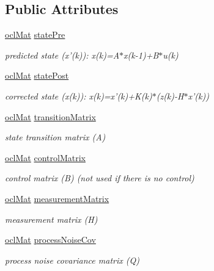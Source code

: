 \subsection*{Public Attributes}
\begin{DoxyCompactItemize}
\item 
\hyperlink{classcv_1_1ocl_1_1oclMat}{ocl\-Mat} \hyperlink{classcv_1_1ocl_1_1KalmanFilter_ac9e06e20a8d043a4564b835d422977b9}{state\-Pre}
\begin{DoxyCompactList}\small\item\em predicted state (x'(k))\-: x(k)=A$\ast$x(k-\/1)+\-B$\ast$u(k) \end{DoxyCompactList}\item 
\hyperlink{classcv_1_1ocl_1_1oclMat}{ocl\-Mat} \hyperlink{classcv_1_1ocl_1_1KalmanFilter_a7988dd038dc54b0a8506a4da0ddcf39b}{state\-Post}
\begin{DoxyCompactList}\small\item\em corrected state (x(k))\-: x(k)=x'(k)+\-K(k)$\ast$(z(k)-\/\-H$\ast$x'(k)) \end{DoxyCompactList}\item 
\hyperlink{classcv_1_1ocl_1_1oclMat}{ocl\-Mat} \hyperlink{classcv_1_1ocl_1_1KalmanFilter_ac31e8bbbeeabf0132ad39d39996f1b0f}{transition\-Matrix}
\begin{DoxyCompactList}\small\item\em state transition matrix (A) \end{DoxyCompactList}\item 
\hyperlink{classcv_1_1ocl_1_1oclMat}{ocl\-Mat} \hyperlink{classcv_1_1ocl_1_1KalmanFilter_a99831c353c2aacc9d9ff3c9ae58f669a}{control\-Matrix}
\begin{DoxyCompactList}\small\item\em control matrix (B) (not used if there is no control) \end{DoxyCompactList}\item 
\hyperlink{classcv_1_1ocl_1_1oclMat}{ocl\-Mat} \hyperlink{classcv_1_1ocl_1_1KalmanFilter_ad3c86cdbe65d9efaf008f23eba39441c}{measurement\-Matrix}
\begin{DoxyCompactList}\small\item\em measurement matrix (H) \end{DoxyCompactList}\item 
\hyperlink{classcv_1_1ocl_1_1oclMat}{ocl\-Mat} \hyperlink{classcv_1_1ocl_1_1KalmanFilter_ae76b58392465d7d5ac4df75ca67edf96}{process\-Noise\-Cov}
\begin{DoxyCompactList}\small\item\em process noise covariance matrix (Q) \end{DoxyCompactList}\item 

\end{DoxyCompactItemize}

